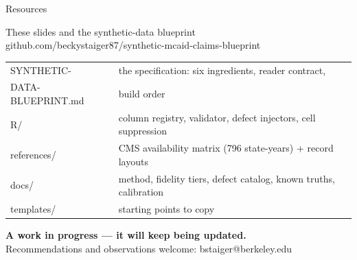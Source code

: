 \documentclass[notes,11pt, aspectratio=169, xcolor={table}]{beamer}
\newcommand{\code}[1]{{\ttfamily\small #1}}
\begin{document}
\begin{frame}{Resources}

\vspace{0.8em}
\begin{center}
{\large These slides and the synthetic-data blueprint}\\[5pt]
\code{github.com/beckystaiger87/synthetic-mcaid-claims-blueprint}
\end{center}

\vspace{0.8em}
\footnotesize
\begin{center}
\begin{tabular}{L{0.20\textwidth} L{0.66\textwidth}}
\toprule
\code{SYNTHETIC-} & the specification: six ingredients, reader contract, \\
\code{DATA-BLUEPRINT.md} & \hspace{0pt}build order \\[3pt]
\code{R/} & column registry, validator, defect injectors, cell suppression \\[3pt]
\code{references/} & CMS availability matrix (796 state-years) + record layouts \\[3pt]
\code{docs/} & method, fidelity tiers, defect catalog, known truths, calibration \\[3pt]
\code{templates/} & starting points to copy \\
\bottomrule
\end{tabular}
\end{center}

\vspace{1.0em}
\normalsize
\begin{center}
\begin{minipage}{0.88\textwidth}
\color{blue}\textbf{A work in progress --- it will keep being updated.}\\[4pt]
\normalsize\color{black} Recommendations and observations welcome:
{\large\code{bstaiger@berkeley.edu}}
\end{minipage}
\end{center}
\end{frame}
\end{document}
